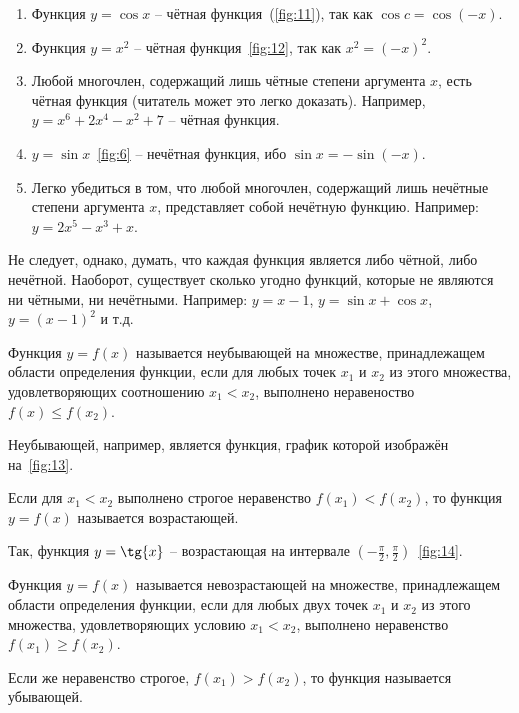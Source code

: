 \begin{example}
	\begin{enumerate}
		\item Функция $y = \cos{x}$ -- чётная функция~(\ref{fig:11}),
			так как $\cos{c} = \cos{(-x)}$.
		\item Функция $y = x^2$ -- чётная функция~\ref{fig:12}, так как
			$x^2 = (-x)^2$.
		\item Любой многочлен, содержащий лишь чётные степени аргумента
			$x$, есть чётная функция (читатель может это легко
			доказать). Например, $y = x^6 + 2x^4 - x^2 + 7$ --
			чётная функция.
		\item $y = \sin{x}$~\ref{fig:6} -- нечётная функция, ибо
			$\sin{x} = -\sin{(-x)}$.
		\item Легко убедиться в том, что любой многочлен, содержащий
			лишь нечётные степени аргумента $x$, представляет собой
			нечётную функцию. Например: $y = 2x^5 - x^3 + x$.
	\end{enumerate}
\end{example}

Не следует, однако, думать, что каждая функция является либо чётной, либо
нечётной. Наоборот, существует сколько угодно функций, которые не являются ни
чётными, ни нечётными. Например: $y = x - 1$, $y = \sin{x} + \cos{x}$, $y = (x -
1)^2$ и т.д.



\begin{definition}
	Функция $y = f(x)$ называется неубывающей на множестве, принадлежащем
	области определения функции, если для любых точек $x_1$ и $x_2$ из этого
	множества, удовлетворяющих соотношению $x_1 < x_2$, выполнено
	неравеноство $f(x) \leq f(x_2)$.
\end{definition}

Неубывающей, например, является функция, график которой изображён
на~\ref{fig:13}.


Если для $x_1 < x_2$ выполнено строгое неравенство $f(x_1) < f(x_2)$, то функция
$y = f(x)$ называется возрастающей.

Так, функция $y = \tg{x}$ -- возрастающая на интервале $(-\frac{\pi}{2},
\frac{\pi}{2})$~\ref{fig:14}.


\begin{definition}
	Функция $y = f(x)$ называется невозрастающей на множестве, принадлежащем
	области определения функции, если для любых двух точек $x_1$ и $x_2$ из
	этого множества, удовлетворяющих условию $x_1 < x_2$, выполнено
	неравенство $f(x_1) \geq f(x_2)$.

	Если же неравенство строгое, $f(x_1) > f(x_2)$, то функция называется
	убывающей.
\end{definition}

